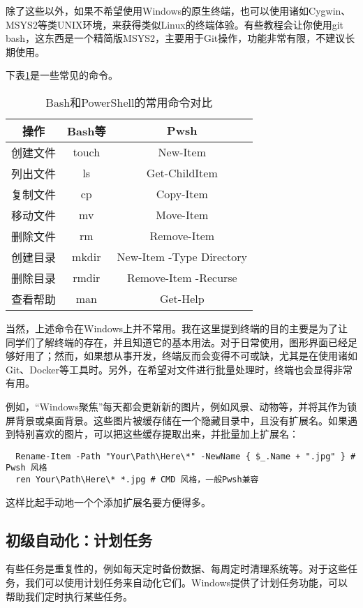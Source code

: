 除了这些以外，如果不希望使用Windows的原生终端，也可以使用诸如Cygwin、MSYS2等类UNIX环境，来获得类似Linux的终端体验。有些教程会让你使用git bash，这东西是一个精简版MSYS2，主要用于Git操作，功能非常有限，不建议长期使用。

下表\ref{tab:terminal-commands}是一些常见的命令。

\begin{table}[ht]
  \centering
  \begin{tabular}{c|cc}
    \hline
    \textbf{操作} & \textbf{Bash等} & \textbf{Pwsh} \\
    \hline
    创建文件 & touch & New-Item \\
    列出文件 & ls & Get-ChildItem \\
    复制文件 & cp & Copy-Item \\
    移动文件 & mv & Move-Item \\
    删除文件 & rm & Remove-Item \\
    创建目录 & mkdir & New-Item -Type Directory \\
    删除目录 & rmdir & Remove-Item -Recurse \\
    查看帮助 & man & Get-Help \\
    \hline
  \end{tabular}
  \caption{Bash和PowerShell的常用命令对比}
  \label{tab:terminal-commands}
\end{table}

当然，上述命令在Windows上并不常用。我在这里提到终端的目的主要是为了让同学们了解终端的存在，并且知道它的基本用法。对于日常使用，图形界面已经足够好用了；然而，如果想从事开发，终端反而会变得不可或缺，尤其是在使用诸如Git、Docker等工具时。另外，在希望对文件进行批量处理时，终端也会显得非常有用。

例如，“Windows聚焦”每天都会更新新的图片，例如风景、动物等，并将其作为锁屏背景或桌面背景。这些图片被缓存储在一个隐藏目录中，且没有扩展名。如果遇到特别喜欢的图片，可以把这些缓存提取出来，并批量加上扩展名：
\begin{lstlisting}
  Rename-Item -Path "Your\Path\Here\*" -NewName { $_.Name + ".jpg" } # Pwsh 风格
  ren Your\Path\Here\* *.jpg # CMD 风格，一般Pwsh兼容
\end{lstlisting}
这样比起手动地一个个添加扩展名要方便得多。

\subsection{初级自动化：计划任务}

有些任务是重复性的，例如每天定时备份数据、每周定时清理系统等。对于这些任务，我们可以使用计划任务来自动化它们。Windows提供了计划任务功能，可以帮助我们定时执行某些任务。

